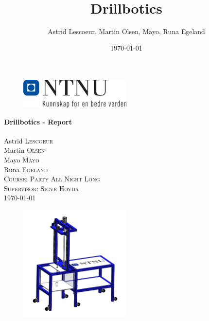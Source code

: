 \documentclass[a4paper,english,12pt]{article}
\author{Astrid Lescoeur, Martin Olsen, Mayo, Runa Egeland}
\title{Drillbotics}
\date{\today}
\begin{document}
\begin{titlepage}

\begin{figure}[H]
\centering
\includegraphics[width=0.5\textwidth]{figures/logontnu1.png}
\end{figure}

\vspace{2cm}


\center 
{\huge \bfseries Drillbotics - Report}\\[0.4cm]

\Large \emph{}\\
Astrid \textsc{Lescoeur}\\[0.5cm]
Martin \textsc{Olsen}\\[0.5cm]
Mayo \textsc{Mayo}\\[0.5cm]
Runa \textsc{Egeland}\\[0.5cm]


\textsc{\large Course: Party All Night Long }\\[0.5cm] %

\textsc{\large Supervisor: Sigve Hovda}\\[0.5cm]

{\large \today}\\[0.5cm] 


\begin{figure} [H]
\centering
\includegraphics[width=0.5\textwidth]{figures/FrontPage.PNG}
\label{fig:rig}
\end{figure}


\vfill
\end{titlepage}
\end{document}
